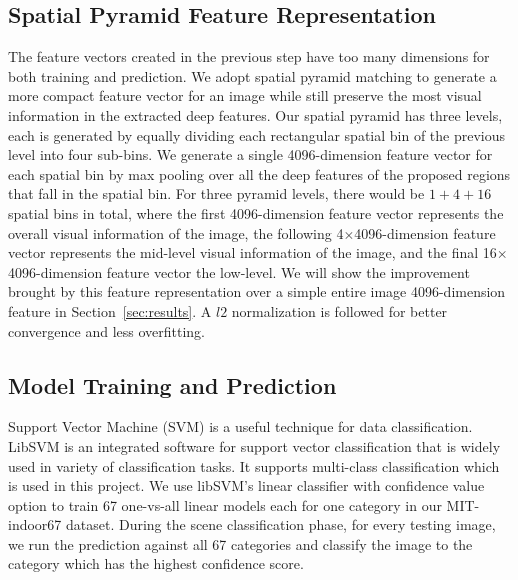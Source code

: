 \subsection{Spatial Pyramid Feature Representation}
The feature vectors created in the previous step have too many dimensions for
both training and prediction. We adopt spatial pyramid matching to generate
a more compact feature vector for an image while still preserve the most visual
information in the extracted deep features. Our spatial pyramid has three
levels, each is generated by equally dividing each rectangular spatial bin of
the previous level into four sub-bins. We generate a single 4096-dimension
feature vector for each spatial bin by max pooling over all the deep features
of the proposed regions that fall in the spatial bin. For three pyramid levels,
there would be $1+4+16$ spatial bins in total, where the first 4096-dimension
feature vector represents the overall visual information of the image, the
following 4$\times$4096-dimension feature vector represents the mid-level
visual information of the image, and the final 16$\times$4096-dimension feature
vector the low-level. We will show the improvement brought by this feature
representation over a simple entire image 4096-dimension feature in
Section~\ref{sec:results}. A $l2$ normalization is followed for better
convergence and less overfitting.

\subsection{Model Training and Prediction}
Support Vector Machine (SVM) is a useful technique for data classification.
LibSVM\cite{Chang:2011:CC01a} is an integrated software for support vector
classification that is widely used in variety of classification tasks. It
supports multi-class classification which is used in this project. We use
libSVM's linear classifier with confidence value option to train 67 one-vs-all
linear models each for one category in our MIT-indoor67 dataset. During the
scene classification phase, for every testing image, we run the prediction
against all 67 categories and classify the image to the category which has
the highest confidence score.
